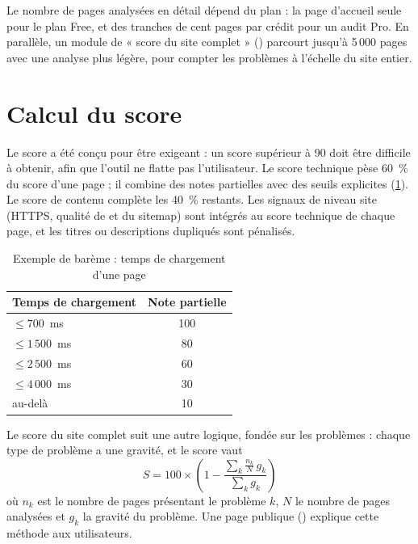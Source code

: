 Le nombre de pages analysées en détail dépend du plan : la page d'accueil seule pour le plan Free, et des tranches de cent pages par crédit pour un audit Pro. En parallèle, un module de « score du site complet » () parcourt jusqu'à 5\,000 pages avec une analyse plus légère, pour compter les problèmes à l'échelle du site entier. 

\section{Calcul du score}
Le score a été conçu pour être exigeant : un score supérieur à 90 doit être difficile à obtenir, afin que l'outil ne flatte pas l'utilisateur. Le score technique pèse 60~\% du score d'une page ; il combine des notes partielles avec des seuils explicites (\cref{tab-seuils}). Le score de contenu complète les 40~\% restants. Les signaux de niveau site (HTTPS, qualité de  et du sitemap) sont intégrés au score technique de chaque page, et les titres ou descriptions dupliqués sont pénalisés.

\begin{table}[htbp]
\centering
\small
\caption{Exemple de barème : temps de chargement d'une page}\label{tab-seuils}
\begin{tabular}{@{}lc@{}}
\toprule
\textbf{Temps de chargement} & \textbf{Note partielle}\\
\midrule
$\leq 700$~ms & 100\\
$\leq 1\,500$~ms & 80\\
$\leq 2\,500$~ms & 60\\
$\leq 4\,000$~ms & 30\\
au-delà & 10\\
\bottomrule
\end{tabular}
\end{table}

Le score du site complet suit une autre logique, fondée sur les problèmes : chaque type de problème a une gravité, et le score vaut
\[ S = 100 \times \left(1 - \frac{\sum_k \frac{n_k}{N}\, g_k}{\sum_k g_k}\right) \]
où $n_k$ est le nombre de pages présentant le problème $k$, $N$ le nombre de pages analysées et $g_k$ la gravité du problème. Une page publique () explique cette méthode aux utilisateurs. 

